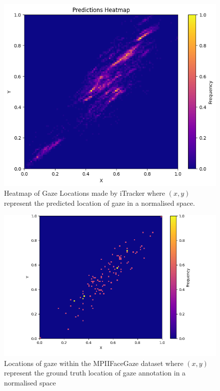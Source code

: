 \documentclass{report}
\begin{document}
\begin{figure}
    \centering
    \includegraphics[scale=1]{../assets/heatmap.png}
    \caption{Heatmap of Gaze Locations made by iTracker where $(x, y)$ represent the predicted location of gaze in a normalised space.}
    \label{fig:heatmap}
\end{figure}

\begin{figure}
    \begin{center}
        \includegraphics[scale=0.5]{../assets/log-mpii.png}   
    \end{center}
    \caption{Locations of gaze within the MPIIFaceGaze dataset where $(x, y)$ represent the ground truth location of gaze annotation in a normalised space}
    \label{fig:log-mpii}
\end{figure}
\end{document}
